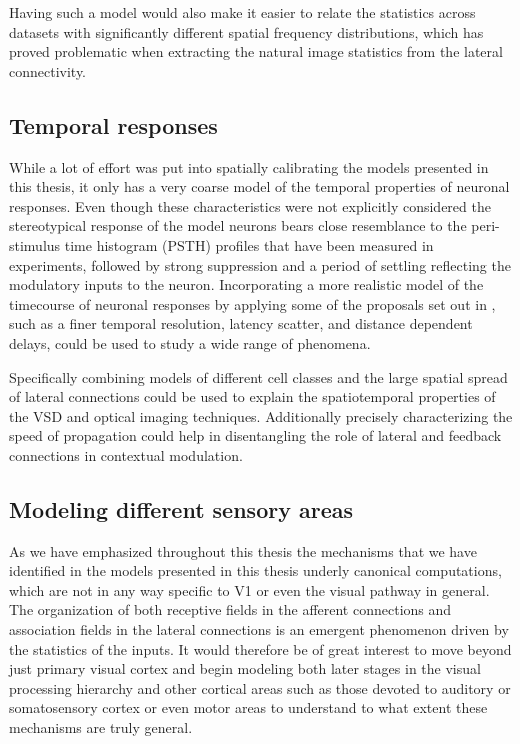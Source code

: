 Having such a model would also make it easier to relate the statistics
across datasets with significantly different spatial frequency
distributions, which has proved problematic when extracting the
natural image statistics from the lateral connectivity.

\subsection{Temporal responses}

While a lot of effort was put into spatially calibrating the models
presented in this thesis, it only has a very coarse model of the
temporal properties of neuronal responses. Even though these
characteristics were not explicitly considered the stereotypical
response of the model neurons bears close resemblance to the
peri-stimulus time histogram (PSTH) profiles that have been measured
in experiments, followed by strong suppression and a period of
settling reflecting the modulatory inputs to the neuron. Incorporating
a more realistic model of the timecourse of neuronal responses by
applying some of the proposals set out in \cite{Stevens2016}, such as
a finer temporal resolution, latency scatter, and distance dependent
delays, could be used to study a wide range of phenomena.

Specifically combining models of different cell classes and the large
spatial spread of lateral connections could be used to explain the
spatiotemporal properties of the VSD and optical imaging
techniques. Additionally precisely characterizing the speed of
propagation could help in disentangling the role of lateral and
feedback connections in contextual modulation.

\subsection{Modeling different sensory areas}

As we have emphasized throughout this thesis the mechanisms that we
have identified in the models presented in this thesis underly
canonical computations, which are not in any way specific to V1 or
even the visual pathway in general. The organization of both receptive
fields in the afferent connections and association fields in the
lateral connections is an emergent phenomenon driven by the statistics
of the inputs. It would therefore be of great interest to move beyond
just primary visual cortex and begin modeling both later stages in the
visual processing hierarchy and other cortical areas such as those
devoted to auditory or somatosensory cortex or even motor areas to
understand to what extent these mechanisms are truly general.

